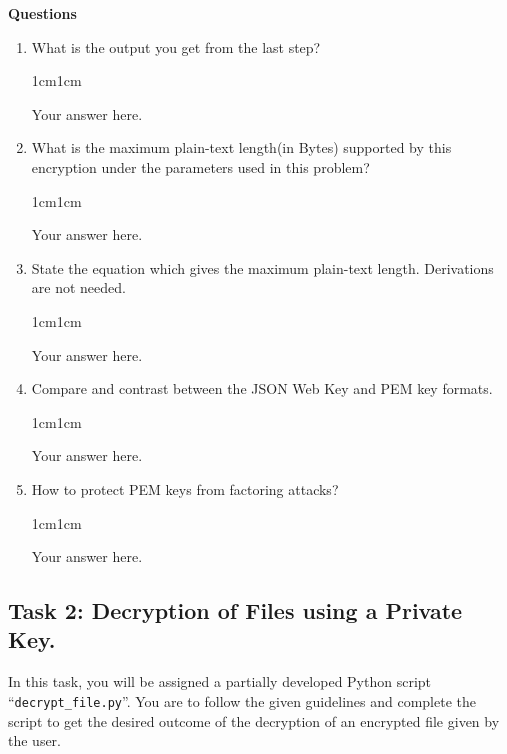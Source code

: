 \documentclass[11pt,letterpaper]{article}
\newenvironment{answer}{\em \color{blue} \begin{adjustwidth}{1cm}{1cm}}{\end{adjustwidth}}
\begin{document}
\noindent \textbf{Questions}
\medskip
\begin{enumerate}
    \item What is the output you get from the last step?
        \begin{answer}
	
		Your answer here.
		
	\end{answer}
    \item What is the maximum plain-text length(in Bytes) supported by this encryption under the parameters used in this problem?
        \begin{answer}
	
		Your answer here.
		
	\end{answer}
    \item State the equation which gives the maximum plain-text length. Derivations are not needed.
        \begin{answer}
	
		Your answer here.
		
	\end{answer}
    \item Compare and contrast between the JSON Web Key and PEM key formats.
        \begin{answer}
	
		Your answer here.
		
	\end{answer}
    \item How to protect PEM keys from factoring attacks?
        \begin{answer}
	
		Your answer here.
		
	\end{answer}

\end{enumerate}


\subsection*{Task 2: Decryption of Files using a Private Key.}
%
In this task, you will be assigned a partially developed Python script ``\texttt{decrypt\_file.py}''. You are to follow the given guidelines and complete the script to get the desired outcome of the decryption of an encrypted file given by the user.
\end{document}

